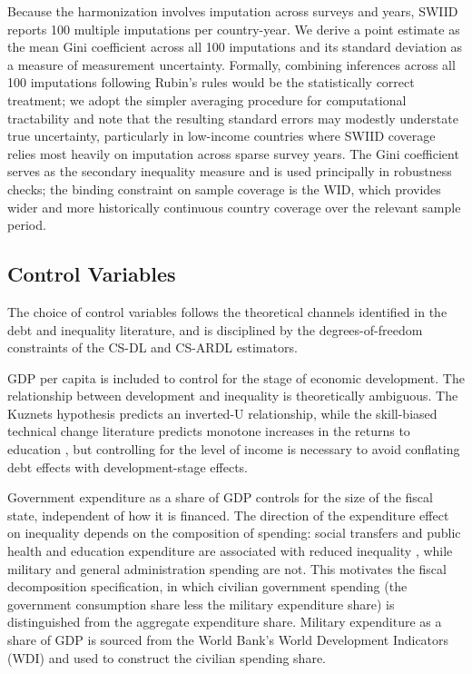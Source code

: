 \documentclass[12pt, titlepage]{article}
\numberwithin{equation}{section}
\begin{document}
Because the harmonization involves imputation across surveys and years,
SWIID reports 100 multiple imputations per country-year. We derive a point
estimate as the mean Gini coefficient across all 100 imputations and its
standard deviation as a measure of measurement uncertainty. Formally,
combining inferences across all 100 imputations following Rubin's rules
\citep{Rubin1987} would be the statistically correct treatment; we adopt the
simpler averaging procedure for computational tractability and note that the
resulting standard errors may modestly understate true uncertainty,
particularly in low-income countries where SWIID coverage relies most heavily
on imputation across sparse survey years. The Gini coefficient serves as the
secondary inequality measure and is used principally in robustness checks;
the binding constraint on sample coverage is the WID, which provides wider
and more historically continuous country coverage over the relevant sample
period.

\subsection{Control Variables}

The choice of control variables follows the theoretical channels identified
in the debt and inequality literature, and is disciplined by the
degrees-of-freedom constraints of the CS-DL and CS-ARDL estimators.

GDP per capita is included to control for the stage of economic development.
The relationship between development and inequality is theoretically
ambiguous. The Kuznets hypothesis predicts an inverted-U relationship, while
the skill-biased technical change literature predicts monotone increases in
the returns to education \citep{KatzMurphy1992, Goldin2008}, but controlling
for the level of income is necessary to avoid conflating debt effects with
development-stage effects.

Government expenditure as a share of GDP controls for the size of the fiscal
state, independent of how it is financed. The direction of the expenditure
effect on inequality depends on the composition of spending: social transfers
and public health and education expenditure are associated with reduced
inequality \citep{DablaEtAl2015}, while military and general administration
spending are not. This motivates the fiscal decomposition specification, in
which civilian government spending (the government consumption share less the
military expenditure share) is distinguished from the aggregate expenditure
share. Military expenditure as a share of GDP is sourced from the World
Bank's World Development Indicators (WDI) \citep{WorldBank2024} and used to
construct the civilian spending share.
\end{document}
